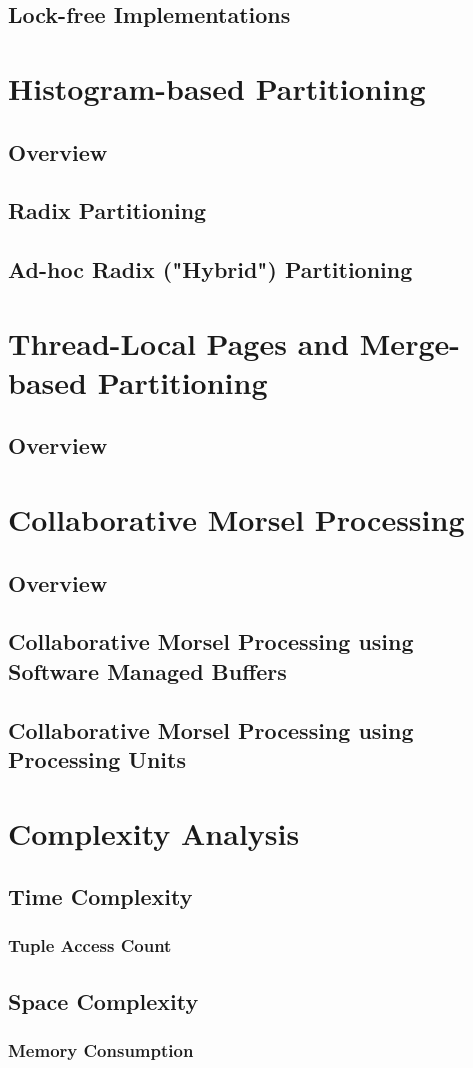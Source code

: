 \subsection{Lock-free Implementations}

\section{Histogram-based Partitioning}
\subsection{Overview}
\subsection{Radix Partitioning}
\subsection{Ad-hoc Radix ("Hybrid") Partitioning}

\section{Thread-Local Pages and Merge-based Partitioning}
\subsection{Overview}

\section{Collaborative Morsel Processing}
\subsection{Overview}
\subsection{Collaborative Morsel Processing using Software Managed Buffers}
\subsection{Collaborative Morsel Processing using Processing Units}

\section{Complexity Analysis}
\subsection{Time Complexity}
\subsubsection{Tuple Access Count}
\subsection{Space Complexity}
\subsubsection{Memory Consumption}
